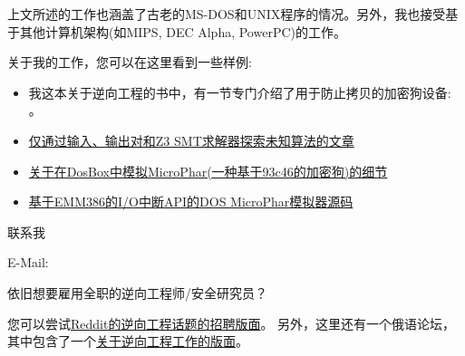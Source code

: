 上文所述的工作也涵盖了古老的MS-DOS和UNIX程序的情况。另外，我也接受基于其他计算机架构(如MIPS, DEC Alpha, PowerPC)的工作。

关于我的工作，您可以在这里看到一些样例:

\begin{itemize}
\item 我这本关于逆向工程的书中，有一节专门介绍了用于防止拷贝的加密狗设备: 。
\item \href{http://yurichev.com/writings/z3_rockey.pdf}{仅通过输入、输出对和Z3 SMT求解器探索未知算法的文章}
\item \href{http://yurichev.com/blog/56/}{关于在DosBox中模拟MicroPhar(一种基于93c46的加密狗)的细节}
\item \href{http://conus.info/dongle/src/microph.asm}{基于EMM386的I/O中断API的DOS MicroPhar模拟器源码}
\end{itemize}

\large 联系我 \normalsize

E-Mail: \GTT{\EMAILS}

\large 依旧想要雇用全职的逆向工程师/安全研究员？ \normalsize

您可以尝试\href{https://www.reddit.com/r/ReverseEngineering/comments/49cza0/rreverseengineerings_2015_triannual_hiring_thread/}{Reddit的逆向工程话题的招聘版面}。
另外，这里还有一个俄语论坛，其中包含了一个\href{https://forum.reverse4you.org/forumdisplay.php?f=252}{关于逆向工程工作的版面}。

\vspace*{\fill}
\vfill
